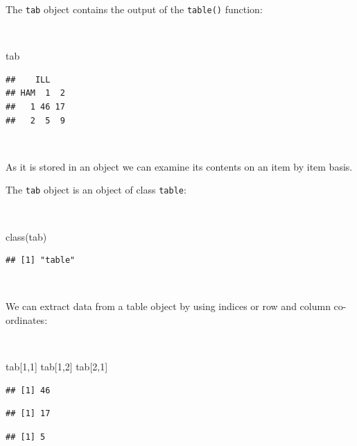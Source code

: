 \documentclass[
  12pt,
]{book}
\newenvironment{Shaded}{\begin{snugshade}}{\end{snugshade}}
\newcommand{\DecValTok}[1]{\textcolor[rgb]{0.00,0.00,0.81}{#1}}
\newcommand{\FunctionTok}[1]{\textcolor[rgb]{0.00,0.00,0.00}{#1}}
\newcommand{\NormalTok}[1]{#1}
\begin{document}
\newpage

The \texttt{tab} object contains the output of the \texttt{table()} function:

~

\begin{Shaded}
\begin{Highlighting}[]
\NormalTok{tab}
\end{Highlighting}
\end{Shaded}

\begin{verbatim}
##    ILL
## HAM  1  2
##   1 46 17
##   2  5  9
\end{verbatim}

~

As it is stored in an object we can examine its contents on an item by item basis.

The \texttt{tab} object is an object of class \texttt{table}:

~

\begin{Shaded}
\begin{Highlighting}[]
\FunctionTok{class}\NormalTok{(tab)}
\end{Highlighting}
\end{Shaded}

\begin{verbatim}
## [1] "table"
\end{verbatim}

~

We can extract data from a table object by using indices or row and column co-ordinates:

~

\begin{Shaded}
\begin{Highlighting}[]
\NormalTok{tab[}\DecValTok{1}\NormalTok{,}\DecValTok{1}\NormalTok{]}
\NormalTok{tab[}\DecValTok{1}\NormalTok{,}\DecValTok{2}\NormalTok{]}
\NormalTok{tab[}\DecValTok{2}\NormalTok{,}\DecValTok{1}\NormalTok{]}
\end{Highlighting}
\end{Shaded}

\begin{verbatim}
## [1] 46
\end{verbatim}

\begin{verbatim}
## [1] 17
\end{verbatim}

\begin{verbatim}
## [1] 5
\end{verbatim}
\end{document}
